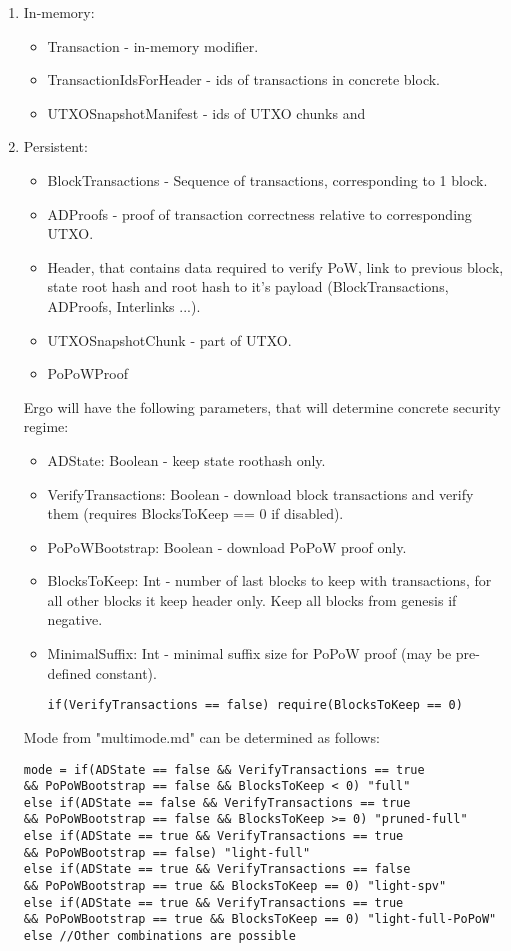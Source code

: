 \documentclass[]{report}   %
\begin{document}
\begin{enumerate}
\item In-memory:
\begin{itemize}
\item Transaction - in-memory modifier.
\item TransactionIdsForHeader - ids of transactions in concrete block.
\item UTXOSnapshotManifest - ids of UTXO chunks and
\end{itemize}
\item Persistent:
\begin{itemize}
\item BlockTransactions - Sequence of transactions, corresponding to 1 block.
\item ADProofs - proof of transaction correctness relative to corresponding UTXO.
\item Header, that contains data required to verify PoW, link to previous block, state root hash and root hash to it's payload (BlockTransactions, ADProofs, Interlinks ...).
\item UTXOSnapshotChunk - part of UTXO.
\item PoPoWProof
\end{itemize}
Ergo will have the following parameters, that will determine concrete security regime:
\begin{itemize}
\item ADState: Boolean - keep state roothash only.
\item VerifyTransactions: Boolean - download block transactions and verify them (requires BlocksToKeep == 0 if disabled).
\item PoPoWBootstrap: Boolean - download PoPoW proof only.
\item BlocksToKeep: Int - number of last blocks to keep with transactions, for all other blocks it keep header only. Keep all blocks from genesis if negative.
\item MinimalSuffix: Int - minimal suffix size for PoPoW proof (may be pre-defined constant).
\begin{verbatim}
if(VerifyTransactions == false) require(BlocksToKeep == 0)
\end{verbatim}
\end{itemize}
Mode from "multimode.md" can be determined as follows:
\begin{verbatim}
mode = if(ADState == false && VerifyTransactions == true
&& PoPoWBootstrap == false && BlocksToKeep < 0) "full"
else if(ADState == false && VerifyTransactions == true
&& PoPoWBootstrap == false && BlocksToKeep >= 0) "pruned-full"
else if(ADState == true && VerifyTransactions == true
&& PoPoWBootstrap == false) "light-full"
else if(ADState == true && VerifyTransactions == false
&& PoPoWBootstrap == true && BlocksToKeep == 0) "light-spv"
else if(ADState == true && VerifyTransactions == true
&& PoPoWBootstrap == true && BlocksToKeep == 0) "light-full-PoPoW"
else //Other combinations are possible
\end{verbatim}
\end{enumerate}
\end{document}
